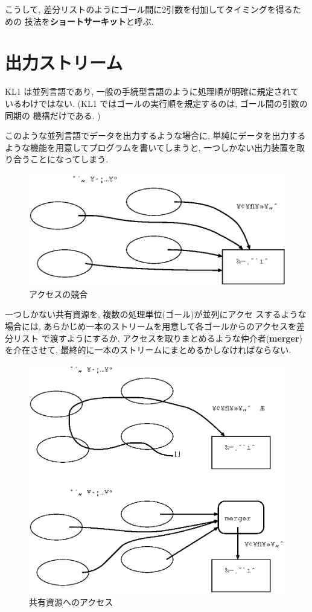 \documentclass[a4,titlepage]{jsreport}
\def\em{\bf\dg}
\let\dg\bf
\begin{document}
  こうして,  差分リストのようにゴール間に2引数を付加してタイミングを得るための
技法を{\dg ショートサーキット}と呼ぶ.  

\section{出力ストリーム}

KL1 は並列言語であり,  一般の手続型言語のように処理順が明確に規定されて
いるわけではない.
  (KL1 ではゴールの実行順を規定するのは, ゴール間の引数の同期の
機構だけである. )\par
  このような並列言語でデータを出力するような場合に,  
単純にデータを出力するような機能を用意してプログラムを書いてしまうと, 
一つしかない出力装置を取り合うことになってしまう.

\begin{figure}[htbp]
  \begin{center}
    \includegraphics[width=.6\textwidth]{fig/dlta.eps}
    \caption{アクセスの競合}
  \end{center}
\end{figure}

一つしかない共有資源を,  複数の処理単位(ゴール)が並列にアクセ
スするような場合には,  
あらかじめ一本のストリームを用意して各ゴールからのアクセスを差分リスト
で渡すようにするか,  アクセスを取りまとめるような仲介者({\em merger})
を介在させて,  最終的に一本のストリームにまとめるかしなければならない.

\begin{figure}[htbp]
  \begin{center}
    \includegraphics[width=.6\textwidth]{fig/dltb.eps}
    \caption{共有資源へのアクセス}
  \end{center}
\end{figure}
\end{document}
